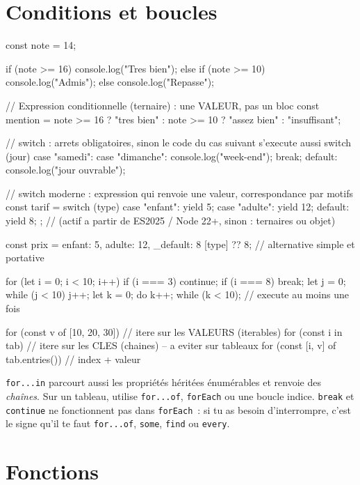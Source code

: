 \documentclass[12pt,a4paper,twoside,openright]{book}
\begin{document}
\section{Conditions et boucles}

\begin{codejs}
const note = 14;

if (note >= 16)       console.log("Tres bien");
else if (note >= 10)  console.log("Admis");
else                  console.log("Repasse");

// Expression conditionnelle (ternaire) : une VALEUR, pas un bloc
const mention = note >= 16 ? "tres bien" : note >= 10 ? "assez bien" : "insuffisant";

// switch : arrets obligatoires, sinon le code du cas suivant s'execute aussi
switch (jour) {
  case "samedi":
  case "dimanche":
    console.log("week-end");
    break;
  default:
    console.log("jour ouvrable");
}

// switch moderne : expression qui renvoie une valeur, correspondance par motifs
const tarif = switch (type) {
  case "enfant":        yield 5;
  case "adulte":        yield 12;
  default:              yield 8;
};                      // (actif a partir de ES2025 / Node 22+, sinon : ternaires ou objet)

const prix = { enfant: 5, adulte: 12, _default: 8 }[type] ?? 8;  // alternative simple et portative

for (let i = 0; i < 10; i++) { if (i === 3) continue; if (i === 8) break; }
let j = 0; while (j < 10) { j++; }
let k = 0; do { k++; } while (k < 10);   // execute au moins une fois

for (const v of [10, 20, 30]) {}          // itere sur les VALEURS (iterables)
for (const i in tab) {}                    // itere sur les CLES (chaines) -- a eviter sur tableaux
for (const [i, v] of tab.entries()) {}     // index + valeur
\end{codejs}

\begin{piege}
\verb|for...in| parcourt aussi les propri\'et\'es h\'erit\'ees \'enum\'erables et renvoie des
\emph{cha\^ines}. Sur un tableau, utilise \verb|for...of|, \verb|forEach| ou une boucle
indice. \verb|break| et \verb|continue| ne fonctionnent pas dans \verb|forEach|~: si tu as besoin
d'interrompre, c'est le signe qu'il te faut \verb|for...of|, \verb|some|, \verb|find| ou \verb|every|.
\end{piege}

\section{Fonctions}
\end{document}
